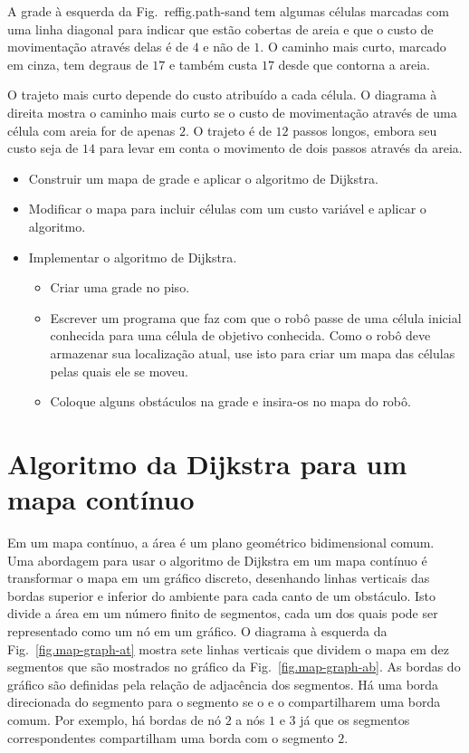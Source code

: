 {A grade à esquerda da Fig.~ref{fig.path-sand} tem algumas células marcadas com uma linha diagonal para indicar que estão cobertas de areia e que o custo de movimentação através delas é de $4$ e não de $1$. O caminho mais curto, marcado em cinza, tem degraus de $17$ e também custa $17$ desde que contorna a areia.

O trajeto mais curto depende do custo atribuído a cada célula. O diagrama à direita mostra o caminho mais curto se o custo de movimentação através de uma célula com areia for de apenas $2$. O trajeto é de $12$ passos longos, embora seu custo seja de $14$ para levar em conta o movimento de dois passos através da areia.

\begin{framed}
\begin{itemize}
\item Construir um mapa de grade e aplicar o algoritmo de Dijkstra.
\item Modificar o mapa para incluir células com um custo variável e aplicar o algoritmo.
\item Implementar o algoritmo de Dijkstra.
\begin{itemize}
\item Criar uma grade no piso.
\item Escrever um programa que faz com que o robô passe de uma célula inicial conhecida para uma célula de objetivo conhecida. Como o robô deve armazenar sua localização atual, use isto para criar um mapa das células pelas quais ele se moveu.
\item Coloque alguns obstáculos na grade e insira-os no mapa do robô.
\end{itemize}
\end{itemize}
\end{framed}

\section{Algoritmo da Dijkstra para um mapa contínuo}\label{s.dijkstra-continuous}

Em um mapa contínuo, a área é um plano geométrico bidimensional comum. Uma abordagem para usar o algoritmo de Dijkstra em um mapa contínuo é transformar o mapa em um gráfico discreto, desenhando linhas verticais das bordas superior e inferior do ambiente para cada canto de um obstáculo. Isto divide a área em um número finito de segmentos, cada um dos quais pode ser representado como um nó em um gráfico. O diagrama à esquerda da Fig.~\ref{fig.map-graph-at} mostra sete linhas verticais que dividem o mapa em dez segmentos que são mostrados no gráfico da Fig.~\ref{fig.map-graph-ab}. As bordas do gráfico são definidas pela relação de adjacência dos segmentos. Há uma borda direcionada do segmento  para o segmento  se o  e o  compartilharem uma borda comum. Por exemplo, há bordas de nó $2$ a nós $1$ e $3$ já que os segmentos correspondentes compartilham uma borda com o segmento $2$.

}

